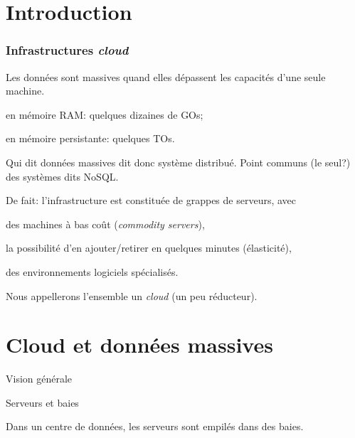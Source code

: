
\section{Introduction}


\begin{frame}
\frametitle{Infrastructures \textit{cloud}}

Les données sont massives quand elles dépassent les capacités d'une
seule machine.

\begin{redbullet}
  \item en mémoire RAM: quelques dizaines de GOs;
  \item en mémoire persistante: quelques TOs.
\end{redbullet}

\vfill

Qui dit \alert{données massives} dit donc \alert{système distribué}. Point communs (le seul?) des 
systèmes dits NoSQL.

\vfill

De fait: l'infrastructure est constituée de grappes de serveurs, avec
\begin{redbullet}
  \item des machines à bas coût (\textit{commodity servers}),
  \item la possibilité d'en ajouter/retirer en quelques minutes (\alert{élasticité}),
  \item des environnements logiciels spécialisés.
\end{redbullet}

Nous appellerons l'ensemble un \textit{cloud} (un peu réducteur).


\end{frame}


\section{Cloud et données massives}

\begin{frame}{Vision générale}


\end{frame}

\begin{frame}{Serveurs et baies}

Dans un centre de données, les serveurs sont empilés dans des baies.
\vfill


\end{frame}


